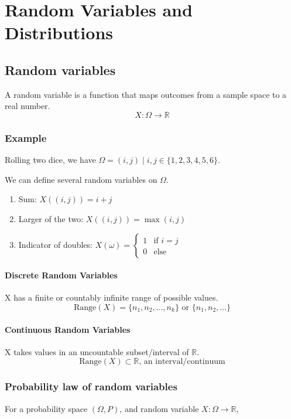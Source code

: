 \documentclass[../Probability.tex]{subfiles}
\begin{document}
\section{Random Variables and Distributions}

\subsection*{Random variables}
A random variable is a function that maps outcomes from a sample space to a real number.
\[X: \Omega \rightarrow \mathbb{R}\]

\subsubsection*{Example}
\noindent Rolling two dice, we have $\Omega = {(i, j)\mid i,j\in \{1,2,3,4,5,6\}}$.

\noindent We can define several random variables on $\Omega$.
\begin{enumerate}
    \item Sum: $X((i,j)) = i + j$
    \item Larger of the two: $X((i, j)) = \max(i, j)$
    \item Indicator of doubles: $X(\omega) = \begin{cases}
        1 & \text{if }i = j \\
        0 & \text{else}
    \end{cases}$
\end{enumerate}

\bigskip

\paragraph{Discrete Random Variables} X has a finite or countably infinite range of possible values.
\[\text{Range}(X) = \{n_1, n_2, \ldots, n_k\} \text{ or } \{n_1, n_2, \ldots\}\]

\paragraph{Continuous Random Variables} X takes values in an uncountable subset/interval of $\mathbb{R}$.
\[\text{Range}(X) \subset \mathbb{R}\text{, an interval/continuum}\]

\subsubsection*{Probability law of random variables}
For a probability space $(\Omega, P)$, and random variable $X: \Omega \rightarrow \mathbb{R}$,
\end{document}
